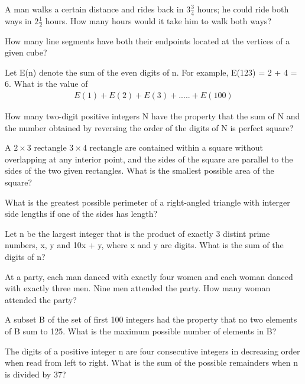 \item A man walks a certain distance and rides back in $3\frac{3}{4}$ hours; he could ride both ways in $2\frac{1}{2}$ hours. How many hours would it take him to walk both ways?

\item How many line segments have both their endpoints located at the vertices of a given cube?

\item Let E(n) denote the sum of the even digits of n. For example, E(123) = 2 + 4 = 6. What is the value of 
\begin{align*}
E(1) + E(2) + E(3) +..... + E(100)
\end{align*}

\item How many two-digit positive integers N have the property that the sum of N and the number obtained by reversing the order of the digits of N is perfect square?

\item A $2 \times 3$ rectangle $3 \times 4$ rectangle are contained within a square without overlapping at any interior point, and the sides of the square are parallel to the sides of the two given rectangles. What is the smallest possible area of the square?

\item What is the greatest possible perimeter of a right-angled triangle with interger side lengths if one of the sides has length?

\item Let n be the largest integer that is the product of exactly 3 distint prime numbers, x, y and 10x + y, where x and y are digits. What is the sum of the digits of n?

\item At a party, each man danced with exactly four women and each woman danced with exactly three men. Nine men attended the party. How many woman attended the party?

\item A subset B of the set of first 100 integers had the property that no two elements of B sum to 125. What is the maximum possible number of elements in B?

\item The digits of a positive integer n are four consecutive integers in decreasing order when read from left to right. What is the sum of the possible remainders when n is divided by 37?






